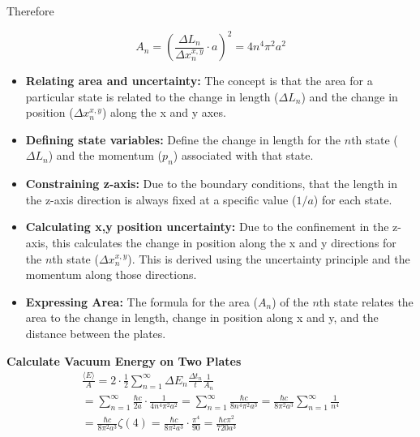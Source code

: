     Therefore

    \[A_n = (\frac{\Delta L_n}{\Delta x_n^{x,y}} \cdot a)^2 = 4 n^4 \pi^2 a^2\]
\begin{itemize}
    \item \textbf{Relating area and uncertainty:} The concept is that the area for a particular state is related to 
    the change in length ($\Delta L_n$) and the change in position ($\Delta x_n^{x,y}$) along the x and y axes.
    \item \textbf{Defining state variables:} Define the change in length for the $n$th state ($\Delta L_n$) 
    and the momentum ($p_n$) associated with that state.
    \item \textbf{Constraining z-axis:} Due to the boundary conditions, 
    that the length in the z-axis direction is always fixed at a specific value ($1/a$) for each state.
    \item \textbf{Calculating x,y position uncertainty:} Due to the confinement in the z-axis, 
    this calculates the change in position along the x and y directions for the $n$th state ($\Delta x_n^{x,y}$). 
    This is derived using the uncertainty principle and the momentum along those directions.
    \item \textbf{Expressing Area:} The formula for the area ($A_n$) of the $n$th state relates the area to the change in length, 
    change in position along x and y, and the distance between the plates.
    \end{itemize}
\noindent\textbf{Calculate Vacuum Energy on Two Plates}
\begin{align*}
    &\frac{\langle E \rangle}{A} = 2 \cdot \frac{1}{2}\sum_{n=1}^{\infty}\Delta E_n\frac{\Delta t_n}{t}\frac{1}{A_n}& \\
    &= \sum_{n=1}^{\infty} \frac{\hbar c }{2 a} \cdot \frac{1}{4 n^4 \pi^2 a^2} = \sum_{n=1}^{\infty} \frac{\hbar c}{8 n^4 \pi^2 a^3} = \frac{\hbar c}{8 \pi^2 a^3} \sum_{n=1}^{\infty} \frac{1}{n^4}&\\
    &= \frac{\hbar c}{8 \pi^2 a^3} \zeta(4) = \frac{\hbar c}{8 \pi^2 a^3} \cdot \frac{\pi^4}{90} = \frac{\hbar c \pi^2}{720 a^3}&
\end{align*}